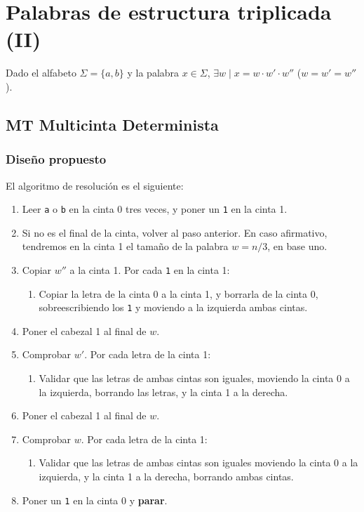 \section{Palabras de estructura triplicada (II)}
Dado el alfabeto $\Sigma = \{a,b\}$ y la palabra $x \in \Sigma$, $\exists w \mid x = w \cdot w' \cdot w''$ ($w=w'=w''$).


\subsection{MT Multicinta Determinista}

\subsubsection*{Diseño propuesto}
El algoritmo de resolución es el siguiente:

\begin{enumerate}
    \item Leer \texttt{a} o \texttt{b} en la cinta 0 tres veces, y poner un \texttt{1} en la cinta 1.
    \item Si no es el final de la cinta, volver al paso anterior. En caso afirmativo, tendremos en la cinta 1 el tamaño de la palabra $w = n/3$, en base uno.
    \item Copiar $w''$ a la cinta 1. Por cada \texttt{1} en la cinta 1:
    \begin{enumerate}[1.]
        \item Copiar la letra de la cinta 0 a la cinta 1, y borrarla de la cinta 0, sobreescribiendo los \texttt{1} y moviendo a la izquierda ambas cintas.
    \end{enumerate}
    \item Poner el cabezal 1 al final de $w$.
    \item Comprobar $w'$. Por cada letra de la cinta 1:
    \begin{enumerate}[1.]
        \item Validar que las letras de ambas cintas son iguales, moviendo la cinta 0 a la izquierda, borrando las letras, y la cinta 1 a la derecha.
    \end{enumerate}
    \item Poner el cabezal 1 al final de $w$.
    \item Comprobar $w$. Por cada letra de la cinta 1:
    \begin{enumerate}[1.]
        \item Validar que las letras de ambas cintas son iguales moviendo la cinta 0 a la izquierda, y la cinta 1 a la derecha, borrando ambas cintas.
    \end{enumerate}
    \item Poner un \texttt{1} en la cinta 0 y \textbf{parar}.
\end{enumerate}


